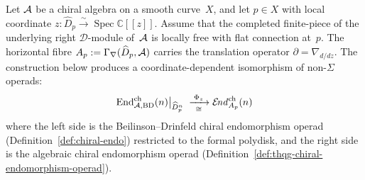 \begin{proposition}
\label{prop:bd-algebraic-bridge}
\ClaimStatusProvedHere
Let $\mathcal{A}$ be a chiral algebra on a smooth curve~$X$, and let
$p \in X$ with local coordinate $z \colon \widehat{D}_p
\xrightarrow{\sim} \operatorname{Spec} \mathbb{C}[[z]]$. Assume
that the completed finite-piece of the underlying right
$\mathcal D$-module of~$\mathcal{A}$ is locally free with flat connection
at~$p$. The horizontal fibre
$A_p := \Gamma_{\nabla}(\widehat{D}_p,\mathcal{A})$ carries the translation
operator $\partial=\nabla_{d/dz}$. The construction below produces
a coordinate-dependent isomorphism of non-$\Sigma$ operads:
\begin{equation}\label{eq:bd-algebraic-bridge}
 \operatorname{End}^{\mathrm{ch}}_{\mathcal{A}, \mathrm{BD}}(n)\big|_{\widehat{D}_p^n}
 \;\xrightarrow[\;\cong\;]{\;\Phi_z\;}
 \mathcal{E}\!\mathit{nd}^{\mathrm{ch}}_{A_p}(n)
\end{equation}
where the left side is the Beilinson--Drinfeld chiral
endomorphism operad
\textup{(Definition~\textup{\ref{def:chiral-endo}})} restricted
to the formal polydisk, and the right side is the algebraic
chiral endomorphism operad
\textup{(Definition~\textup{\ref{def:thqg-chiral-endomorphism-operad}})}.


\end{proposition}
